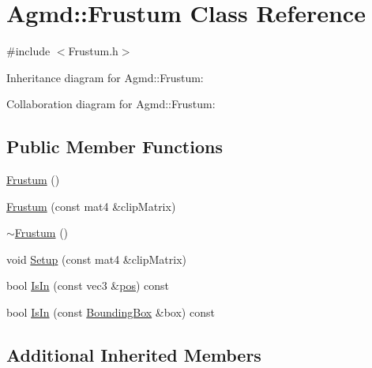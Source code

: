 \hypertarget{class_agmd_1_1_frustum}{\section{Agmd\+:\+:Frustum Class Reference}
\label{class_agmd_1_1_frustum}
}


{\ttfamily \#include $<$Frustum.\+h$>$}



Inheritance diagram for Agmd\+:\+:Frustum\+:


Collaboration diagram for Agmd\+:\+:Frustum\+:
\subsection*{Public Member Functions}
\begin{DoxyCompactItemize}
\item 
\hyperlink{class_agmd_1_1_frustum_a5e5469d8c5d586a6d62e382f245b9c9d}{Frustum} ()
\item 
\hyperlink{class_agmd_1_1_frustum_ac972c636b9fbb308cda969ad45ece325}{Frustum} (const mat4 \&clip\+Matrix)
\item 
\hyperlink{class_agmd_1_1_frustum_aa930871d9b01daecf26be60ea58413e8}{$\sim$\+Frustum} ()
\item 
void \hyperlink{class_agmd_1_1_frustum_a7b23e702b7a3e6587b20b47424678fae}{Setup} (const mat4 \&clip\+Matrix)
\item 
bool \hyperlink{class_agmd_1_1_frustum_ab8b48cd2238ece317558c5fed765cebf}{Is\+In} (const vec3 \&\hyperlink{_examples_2_planet_2_app_8cpp_aa8a1c0491559faca4ebd0881575ae7f0}{pos}) const 
\item 
bool \hyperlink{class_agmd_1_1_frustum_a080c7f0f308f542e5a8d110ecb41e72b}{Is\+In} (const \hyperlink{class_agmd_1_1_bounding_box}{Bounding\+Box} \&box) const 
\end{DoxyCompactItemize}
\subsection*{Additional Inherited Members}



